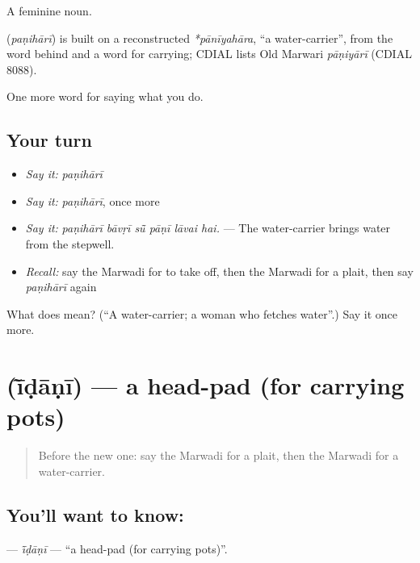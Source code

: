 A feminine noun.

\begin{cousinweb}
\textbf{} (\emph{paṇihārī}) is built on a reconstructed \emph{*pānīyahāra}, \textquotedblleft{}a water-carrier\textquotedblright{}, from the word behind \textbf{} and a word for carrying; CDIAL lists Old Marwari \emph{pāṇiyārī} (CDIAL 8088).
\end{cousinweb}

\begin{grammarlens}[title={What you've built}]
One more word for saying what you do.
\end{grammarlens}

\subsection*{Your turn}
\begin{itemize}
\raggedright
  \item \emph{Say it:} \emph{paṇihārī}
  \item \emph{Say it:} \emph{paṇihārī}, once more
  \item \emph{Say it:} \emph{paṇihārī bāvṛī sū̃ pāṇī lāvai hai.} — The water-carrier brings water from the stepwell.
  \item \emph{Recall:} say the Marwadi for to take off, then the Marwadi for a plait, then say \emph{paṇihārī} again
\end{itemize}

\begin{tcolorbox}[breakable,colback=teal!4,colframe=teal!35!black,title={Before you move on}]
What does  mean? (\textquotedblleft{}A water-carrier; a woman who fetches water\textquotedblright{}.) Say it once more.
\end{tcolorbox}
\section[\texorpdfstring{\mw{ईंडाणी} (ī̃ḍāṇī)}{ईंडाणी (ī̃ḍāṇī)}]{ (ī̃ḍāṇī) — a head-pad (for carrying pots)}

\label{lesson:MW-C175-idani}



\begin{quote}
Before the new one: say the Marwadi for a plait, then the Marwadi for a water-carrier.
\end{quote}

\subsection*{You'll want to know: }
\textbf{} — \emph{ī̃ḍāṇī} — \textquotedblleft{}a head-pad (for carrying pots)\textquotedblright{}.

